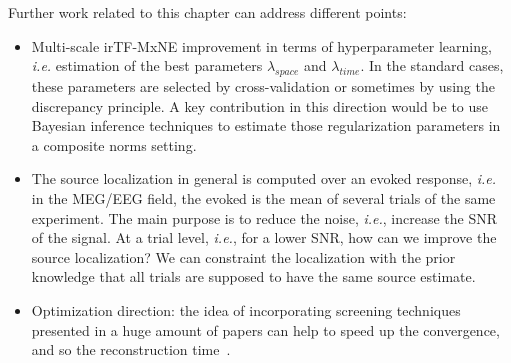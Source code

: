 Further work related to this chapter can address different points:
\begin{itemize}
	\item Multi-scale irTF-MxNE improvement in terms of hyperparameter learning, \textit{i.e.} estimation of the best parameters $\lambda_{space}$ and $\lambda_{time}$. In the standard cases, these parameters are selected by cross-validation or sometimes by using the discrepancy principle. A key contribution in this direction would be to use Bayesian inference techniques to estimate those regularization parameters in a composite norms setting.
    
    \item The source localization in general is computed over an evoked response, \textit{i.e.} in the MEG/EEG field, the evoked is the mean of several trials of the same experiment. The main purpose is to reduce the noise, \textit{i.e.}, increase the SNR of the signal. At a trial level, \textit{i.e.}, for a lower SNR, how can we improve the source localization? We can constraint the localization with the prior knowledge that all trials are supposed to have the same source estimate.
    
    \item Optimization direction: the idea of incorporating screening techniques presented in a huge amount of papers can help to speed up the convergence, and so the reconstruction time~\cite{massias2017safe,massiasgap,fercoq-etal:2015,Ndiaye_Fercoq_Gramfort_Salmon15,ndiaye2016gap,ndiaye2017efficient}.
\end{itemize}

